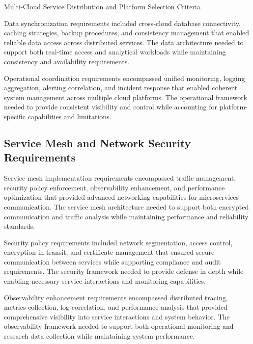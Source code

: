 \begin{table}[H]
\centering
\caption{Multi-Cloud Service Distribution and Platform Selection Criteria}
\label{tab:multi-cloud-distribution}
\end{table}

Data synchronization requirements included cross-cloud database connectivity, caching strategies, backup procedures, and consistency management that enabled reliable data access across distributed services. The data architecture needed to support both real-time access and analytical workloads while maintaining consistency and availability requirements.

Operational coordination requirements encompassed unified monitoring, logging aggregation, alerting correlation, and incident response that enabled coherent system management across multiple cloud platforms. The operational framework needed to provide consistent visibility and control while accounting for platform-specific capabilities and limitations.

\subsection{Service Mesh and Network Security Requirements}

Service mesh implementation requirements encompassed traffic management, security policy enforcement, observability enhancement, and performance optimization that provided advanced networking capabilities for microservices communication. The service mesh architecture needed to support both encrypted communication and traffic analysis while maintaining performance and reliability standards.

Security policy requirements included network segmentation, access control, encryption in transit, and certificate management that ensured secure communication between services while supporting compliance and audit requirements. The security framework needed to provide defense in depth while enabling necessary service interactions and monitoring capabilities.

Observability enhancement requirements encompassed distributed tracing, metrics collection, log correlation, and performance analysis that provided comprehensive visibility into service interactions and system behavior. The observability framework needed to support both operational monitoring and research data collection while maintaining system performance.

